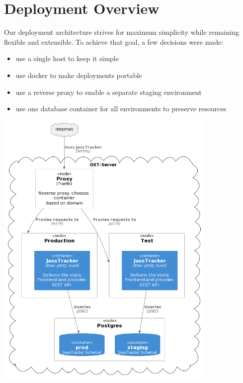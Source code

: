 \section{Deployment Overview}
\label{sec:architecture_deployment}
Our deployment architecture strives for maximum simplicity while remaining flexible and extensible.
To achieve that goal, a few decisions were made:
\begin{itemize}
    \item use a single host to keep it simple
    \item use docker to make deployments portable
    \item use a reverse proxy to enable a separate staging environment
    \item use one database container for all environments to preserve resources
\end{itemize}

\includegraphics[width=0.8\textwidth]{resources/diagrams/c4-deployment}
